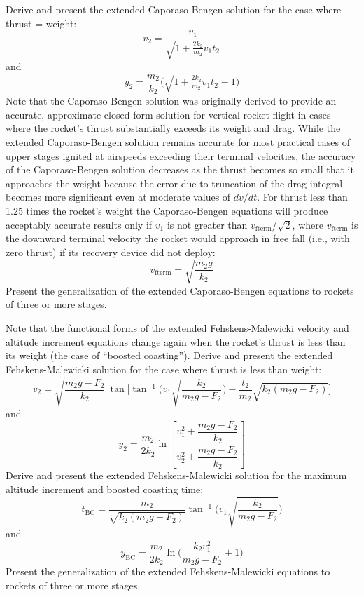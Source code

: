 Derive and present the extended Caporaso-Bengen solution for the case where thrust = weight:
\begin{equation*}
v_2 = \frac{v_1}{\sqrt{1 + \tfrac{2k_2}{m_2}v_1t_2}}
\end{equation*}
and
\begin{equation*}
y_2 = \frac{m_2}{k_2}\biggl(\sqrt{1 + \tfrac{2k_2}{m_2}v_1t_2} - 1\biggr)
\end{equation*}
Note that the Caporaso-Bengen solution was originally derived to provide an accurate, approximate
closed-form solution for vertical rocket flight in cases where the rocket's thrust substantially exceeds its
weight and drag. While the extended Caporaso-Bengen solution remains accurate for most practical cases of
upper stages ignited at airspeeds exceeding their terminal velocities, the accuracy of the Caporaso-Bengen
solution decreases as the thrust becomes so small that it approaches the weight because the error due to
truncation of the drag integral becomes more significant even at moderate values of $dv/dt$. For thrust
less than 1.25 times the rocket's weight the Caporaso-Bengen equations will produce acceptably accurate
results only if $v_1$ is not greater than $v_{\mathrm{fterm}}/\sqrt{2}$, where $v_{\mathrm{fterm}}$ is the
downward terminal velocity the rocket would approach in free fall (i.e., with zero thrust) if its recovery
device did not deploy:
\begin{equation*}
v_{\mathrm{fterm}} = \sqrt{\frac{m_2g}{k_2}}
\end{equation*}
Present the generalization of the extended Caporaso-Bengen equations to rockets of three or more stages.

Note that the functional forms of the extended Fehskens-Malewicki velocity and altitude increment equations
change again when the rocket's thrust is less than its weight (the case of ``boosted coasting''). Derive and
present the extended Fehskens-Malewicki solution for the case where thrust is less than weight:
\begin{equation*}
v_2 = \sqrt{\frac{m_2g - F_2}{k_2}}\,\tan\biggl[\tan^{-1}\biggl(v_1\sqrt{\frac{k_2}{m_2g - F_2}}\biggr)
  - \frac{t_2}{m_2}\sqrt{k_2(m_2g - F_2)}\biggr]
\end{equation*}
and
\begin{equation*}
y_2 = \frac{m_2}{2k_2}\ln\left[\frac{v_1^{2} + \dfrac{m_2g - F_2}{k_2}}{v_2^{2} + \dfrac{m_2g - F_2}{k_2}}
  \right]
\end{equation*}
Derive and present the extended Fehskens-Malewicki solution for the maximum altitude increment and boosted
coasting time:
\begin{equation*}
t_{\mathrm{BC}} = \frac{m_2}{\sqrt{k_2(m_2g - F_2)}}\tan^{-1}\biggl(v_1\sqrt{\frac{k_2}{m_2g - F_2}}\biggr)
\end{equation*}
and
\begin{equation*}
y_{\mathrm{BC}} = \frac{m_2}{2k_2}\ln\biggl(\frac{k_2v_1^{2}}{m_2g - F_2} + 1\biggr)
\end{equation*}
Present the generalization of the extended Fehskens-Malewicki equations to rockets of three or more stages.


